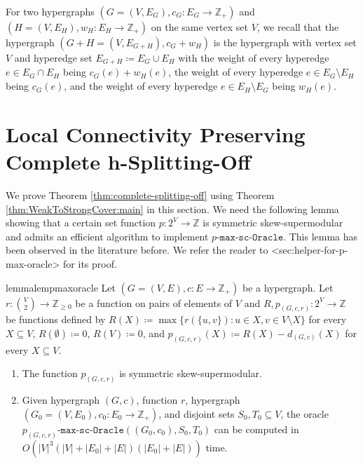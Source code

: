 \documentclass{article}
\def\Cref#1{<#1>}%
\newcommand{\functionMaximizationOracleStrongCover}[1]{\ensuremath{{#1}\text{-}\mathtt{max}\text{-}\mathtt{sc}\text{-}\mathtt{Oracle}}\xspace}
\providecommand{\Z}{\mathbb{Z}}
\begin{document}
For two hypergraphs $(G=(V, E_G), c_G:E_G\rightarrow \Z_+)$ and $(H=(V, E_H), w_H: E_H\rightarrow \Z_+)$ on the same vertex set $V$, we recall that the hypergraph $(G+H=(V, E_{G+H}), c_G+w_H)$ is the hypergraph with vertex set $V$ and hyperedge set $E_{G+H}\coloneqq E_G\cup E_H$ with the weight of every hyperedge $e\in E_G\cap E_H$ being $c_G(e) + w_H(e)$, the weight of every hyperedge $e\in E_G\setminus E_H$ being $c_G(e)$,  and the weight of every hyperedge $e\in E_H\setminus E_G$ being $w_H(e)$. 
\section{Local Connectivity Preserving Complete h-Splitting-Off}
\label{sec:hypergraph-splitting-off-proof}
We prove Theorem \ref{thm:complete-splitting-off} using Theorem \ref{thm:WeakToStrongCover:main} in this section. 
We need the following lemma showing that a certain set function $p: 2^V\rightarrow \Z$ is symmetric skew-supermodular and admits an efficient algorithm to implement \functionMaximizationOracleStrongCover{p}. This lemma has been observed in the literature before. We refer the reader to \Cref{sec:helper-for-p-max-oracle} for its proof. 

\begin{restatable}{lemma}{lempmaxoracle}\label{lemma:helper-for-p-max-oracle}
    Let $(G=(V, E), c: E\rightarrow \Z_+)$ be a hypergraph. Let $r:\binom{V}{2}\rightarrow \Z_{\ge 0}$ be a function on pairs of elements of $V$ and $R, p_{(G, c, r)}:2^V\rightarrow \Z$ be functions defined by $R(X)\coloneqq \max\{r(\{u, v\}): u\in X, v\in V\setminus X\}$ for every $X\subseteq V$, $R(\emptyset)\coloneqq 0$, $R(V)\coloneqq 0$, and $p_{(G, c, r)}(X)\coloneqq R(X)-d_{(G, c)}(X)$ for every $X\subseteq V$. 
    \begin{enumerate}
        \item The function $p_{(G, c, r)}$ is symmetric skew-supermodular. 
        \item 
        Given hypergraph $(G, c)$, function $r$, hypergraph $(G_0=(V, E_0), c_0: E_0\rightarrow \Z_{+})$, and disjoint sets $S_0, T_0\subseteq V$, the oracle   \functionMaximizationOracleStrongCover{p_{(G, c, r)}}$((G_0, c_0), S_0, T_0)$ can be computed in $O(|V|^3(|V|+|E_0|+|E|)(|E_0|+|E|))$ time.

    \end{enumerate}
\end{restatable}
\end{document}
